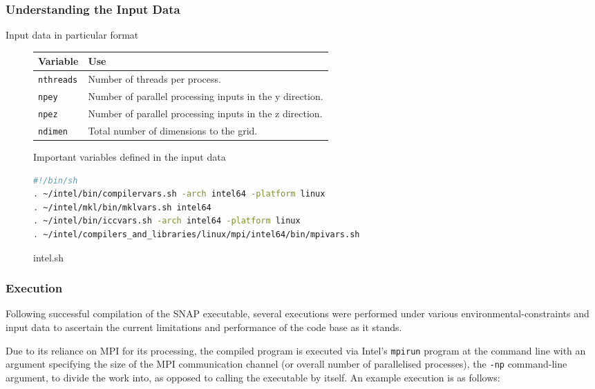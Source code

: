 \documentclass[conference]{IEEEtran}
\begin{document}
\subsubsection{Understanding the Input Data}

Input data in particular format

\begin{figure}
    \centering
    \begin{tabular}{| p{1.7cm} | p{5.7cm} |}
        \hline
        Variable & Use \\
        \hline
        \texttt{nthreads} & Number of threads per process. \\
        \texttt{npey} & Number of parallel processing inputs in the y direction. \\
        \texttt{npez} & Number of parallel processing inputs in the z direction. \\
        \texttt{ndimen} & Total number of dimensions to the grid. \\
        \hline
    \end{tabular}
    \caption{Important variables defined in the input data}
    \label{table:input-data}
\end{figure}

\begin{figure}
    \centering
    \begin{lstlisting}[language=bash]
#!/bin/sh
. ~/intel/bin/compilervars.sh -arch intel64 -platform linux
. ~/intel/mkl/bin/mklvars.sh intel64
. ~/intel/bin/iccvars.sh -arch intel64 -platform linux
. ~/intel/compilers_and_libraries/linux/mpi/intel64/bin/mpivars.sh 
    \end{lstlisting}
    \caption{intel.sh}
    \label{fig:source_list}
\end{figure}

\subsubsection{Execution}

Following successful compilation of the SNAP executable, several executions were performed under various environmental-constraints and input data to ascertain the current limitations and performance of the code base as it stands.

Due to its reliance on MPI for its processing, the compiled program is executed via Intel's \texttt{mpirun} program at the command line with an argument specifying the size of the MPI communication channel (or overall number of parallelised processes), the \texttt{-np} command-line argument, to divide the work into, as opposed to calling the executable by itself. An example execution is as follows:
\end{document}
